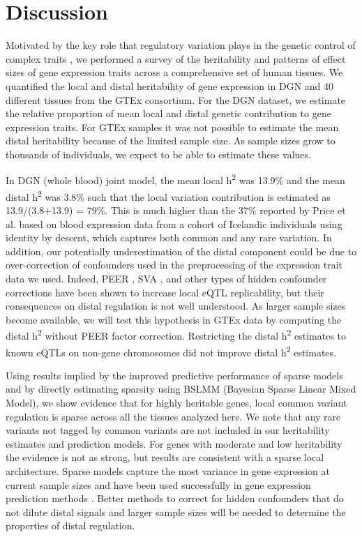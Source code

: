 \documentclass[10pt,letterpaper]{article}
\begin{document}
\section*{Discussion}
Motivated by the key role that regulatory variation plays in the genetic control of complex traits \cite{Nicolae_2010,Nica_2010,Gusev_2014}, we performed a survey of the heritability and patterns of effect sizes of gene expression traits across a comprehensive set of human tissues. We quantified the local and distal heritability of gene expression in DGN and 40 different tissues from the GTEx consortium. For the DGN dataset, we estimate the relative proportion of mean local and distal genetic contribution to gene expression traits. For GTEx samples it was not possible to estimate the mean distal heritability because of the limited sample size. As sample sizes grow to thousands of individuals, we expect to be able to estimate these values.

In DGN (whole blood) joint model, the mean local h\textsuperscript{2} was 13.9\% and the mean distal h\textsuperscript{2} was 3.8\% such that the local variation contribution is estimated as 13.9/(3.8+13.9) = 79\%. This is much higher than the 37\% reported by Price et al. \cite{Price_2011} based on blood expression data from a cohort of Icelandic individuals using identity by descent, which captures both common and any rare variation. In addition, our potentially underestimation of the distal component could be due to over-correction of confounders used in the preprocessing of the expression trait data we used. Indeed, PEER \cite{Stegle_2012}, SVA \cite{Leek_2007}, and other types of hidden confounder corrections have been shown to increase local eQTL replicability, but their consequences on distal regulation is not well understood.  As larger sample sizes become available, we will test this hypothesis in GTEx data by computing the distal h\textsuperscript{2} without PEER factor correction. Restricting the distal h\textsuperscript{2} estimates to known eQTLs  on non-gene chromosomes did not improve distal h\textsuperscript{2} estimates.

Using results implied by the improved predictive performance of sparse models and by directly estimating sparsity using BSLMM (Bayesian Sparse Linear Mixed Model), we show evidence that for highly heritable genes, local common variant regulation is sparse across all the tissues analyzed here. We note that any rare variants not tagged by common variants are not included in our heritability estimates and prediction models. For genes with moderate and low heritability the evidence is not as strong, but results are consistent with a sparse local architecture. Sparse models capture the most variance in gene expression at current sample sizes and have been used successfully in gene expression prediction methods \cite{manor2013robust,Gamazon_2015,gusev2016integrative,zhu2016integration}. Better methods to correct for hidden confounders that do not dilute distal signals and larger sample sizes will be needed to determine the properties of distal regulation. 
\end{document}
